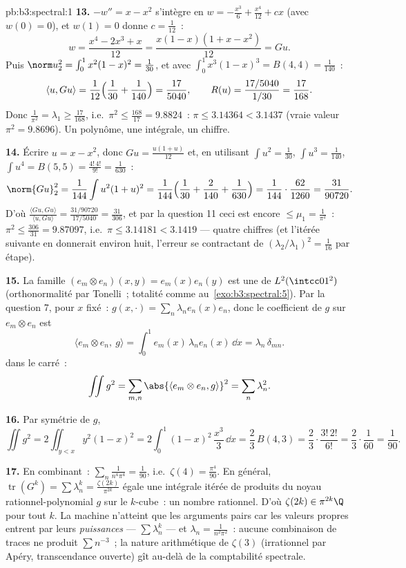 \begin{solution}{pb:b3:spectral:1}
\textbf{13.} $-w'' = x - x^2$ s'intègre en $w = -\frac{x^3}6
+ \frac{x^4}{12} + cx$ (avec $w(0) = 0$), et $w(1) = 0$
donne $c = \frac1{12}$~:
\[
w = \frac{x^4 - 2x^3 + x}{12} = \frac{x(1-x)(1 + x -
x^2)}{12} = Gu .
\]
Puis $\norm u_2^2 = \int_0^1x^2(1-x)^2 = \frac1{30}$, et
avec $\int_0^1x^3(1-x)^3 = B(4,4) = \frac1{140}$~:
\[
\langle u, Gu\rangle = \frac1{12}\Bigl(\frac1{30} +
\frac1{140}\Bigr) = \frac{17}{5040},
\qquad
R(u) = \frac{17/5040}{1/30} = \frac{17}{168} .
\]
Donc $\frac1{\pi^2} = \lambda_1 \geq \frac{17}{168}$, i.e.\
$\pi^2 \leq \frac{168}{17} = 9.8824$~: $\pi \leq 3.14364 <
3.1437$ (vraie valeur $\pi^2 = 9.8696$). Un polynôme, une
intégrale, un chiffre.

\textbf{14.} Écrire $u = x - x^2$, donc $Gu =
\frac{u(1 + u)}{12}$ et, en utilisant $\int u^2 = \frac1{30}$,
$\int u^3 = \frac1{140}$, $\int u^4 = B(5,5) =
\frac{4!\,4!}{9!} = \frac1{630}$~:
\[
\norm{Gu}_2^2 = \frac1{144}\int u^2(1+u)^2 =
\frac1{144}\Bigl(\frac1{30} + \frac2{140} +
\frac1{630}\Bigr) = \frac1{144}\cdot\frac{62}{1260} =
\frac{31}{90720} .
\]
D'où $\frac{\langle Gu, Gu\rangle}{\langle u, Gu\rangle} =
\frac{31/90720}{17/5040} = \frac{31}{306}$, et par la
question 11 ceci est encore $\leq \mu_1 = \frac1{\pi^2}$~:
$\pi^2 \leq \frac{306}{31} = 9.87097$, i.e.\ $\pi \leq
3.14181 < 3.1419$ --- quatre chiffres (et l'itérée suivante
en donnerait environ huit, l'erreur se contractant de
$(\lambda_2/\lambda_1)^2 = \frac1{16}$ par étape).

\textbf{15.} La famille $(e_m \otimes e_n)(x,y) =
e_m(x)e_n(y)$ est une  de
$L^2(\intcc01^2)$ (orthonormalité par Tonelli~; totalité
comme au~\cref{exo:b3:spectral:5}). Par la question 7, pour
$x$ fixé~: $g(x, \cdot) = \sum_n\lambda_ne_n(x)e_n$, donc le
coefficient de $g$ sur $e_m\otimes e_n$ est
\[
\langle e_m\otimes e_n,\ g\rangle
= \int_0^1 e_m(x)\,\lambda_n e_n(x)\,\dd x
= \lambda_n\,\delta_{mn} .
\]
 dans le carré~:
\[
\iint g^2 = \sum_{m,n}\abs{\langle e_m\otimes e_n,
g\rangle}^2 = \sum_n\lambda_n^2 .
\]

\textbf{16.} Par symétrie de $g$,
\[
\iint g^2 = 2\iint_{y<x}y^2(1-x)^2
= 2\int_0^1(1-x)^2\,\frac{x^3}3\,\dd x
= \frac23\,B(4, 3) = \frac23\cdot\frac{3!\,2!}{6!}
= \frac23\cdot\frac1{60} = \frac1{90} .
\]

\textbf{17.} En combinant~: $\sum_n\frac1{n^4\pi^4} =
\frac1{90}$, i.e.\ $\zeta(4) = \frac{\pi^4}{90}$. En
général, $\operatorname{tr}(G^k) = \sum\lambda_n^k =
\frac{\zeta(2k)}{\pi^{2k}}$ égale une intégrale itérée de
produits du noyau rationnel-polynomial $g$ sur le $k$-cube~:
un nombre rationnel. D'où $\zeta(2k) \in \pi^{2k}\Q$ pour
tout $k$. La machine n'atteint que les arguments pairs car
les valeurs propres entrent par leurs \emph{puissances} ---
$\sum\lambda_n^k$ --- et $\lambda_n = \frac1{n^2\pi^2}$~:
aucune combinaison de traces ne produit $\sum n^{-3}$~; la
nature arithmétique de $\zeta(3)$ (irrationnel par Apéry,
transcendance ouverte) gît au-delà de la comptabilité
spectrale.


\end{solution}
